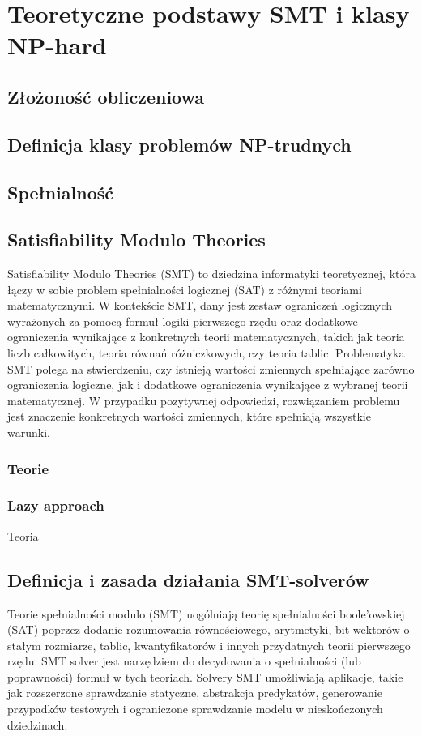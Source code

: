\chapter{Teoretyczne podstawy SMT i klasy NP-hard}
\section{Złożoność obliczeniowa}

\section{Definicja klasy problemów NP-trudnych}

\section{Spełnialność}


\section{Satisfiability Modulo Theories}
	Satisfiability Modulo Theories (SMT) to dziedzina informatyki teoretycznej, która łączy w sobie problem spełnialności logicznej (SAT) z różnymi teoriami matematycznymi.\cite{MouraB11}
	W kontekście SMT, dany jest zestaw ograniczeń logicznych wyrażonych za pomocą formuł logiki pierwszego rzędu oraz dodatkowe ograniczenia wynikające z konkretnych teorii matematycznych, takich jak teoria liczb całkowitych, teoria równań różniczkowych, czy teoria tablic.
	Problematyka SMT polega na stwierdzeniu, czy istnieją wartości zmiennych spełniające zarówno ograniczenia logiczne, jak i dodatkowe ograniczenia wynikające z wybranej teorii matematycznej. W przypadku pozytywnej odpowiedzi, rozwiązaniem problemu jest znaczenie konkretnych wartości zmiennych, które spełniają wszystkie warunki.
	\subsection{Teorie}
	\subsection{Lazy approach}
	Teoria 
\section{Definicja i zasada działania SMT-solverów}
Teorie spełnialności modulo (SMT) uogólniają teorię spełnialności boole'owskiej (SAT) poprzez dodanie rozumowania równościowego, arytmetyki, bit-wektorów o stałym rozmiarze, tablic, kwantyfikatorów i innych przydatnych teorii pierwszego rzędu.
SMT solver jest narzędziem do decydowania o spełnialności (lub poprawności) formuł w tych teoriach. 
Solvery SMT umożliwiają aplikacje, takie jak rozszerzone sprawdzanie statyczne, abstrakcja predykatów, generowanie przypadków testowych i ograniczone sprawdzanie modelu w nieskończonych dziedzinach.


